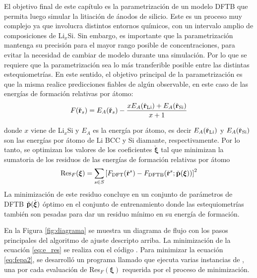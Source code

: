 El objetivo final de este capítulo es la parametrización de un modelo DFTB que 
permita luego simular la litiación de ánodos de silicio. Este es un proceso muy 
complejo ya que involucra distintos entornos químicos, con un intervalo amplio de
composiciones de Li$_x$Si. Sin embargo, es importante que la parametrización
mantenga su precisión para el mayor rango posible de concentraciones, para evitar 
la necesidad de cambiar de modelo  durante una simulación.
Por lo que se requiere que la parametrización sea lo más transferible posible 
entre las distintas estequiometrías. En este sentido, el objetivo principal de la 
parametrización es que la misma realice predicciones fiables de algún observable, 
en este caso de las energías de formación relativas por átomo:
\begin{equation}\label{eq:fepa}
    F(\check{{\bf r}}_s) = E_A(\check{{\bf r}}_s) - \frac{x E_A(\check{{\bf r}}_\text{Li}) + E_A(\check{{\bf r}}_\text{Si})}{x+1}
\end{equation}

donde $x$ viene de Li$_x$Si y $E_A$ es la energía por átomo, es decir 
$E_A(\check{{\bf r}}_\text{Li})$ y $E_A(\check{{\bf r}}_\text{Si})$ son las 
energías por átomo de Li BCC y Si diamante, respectivamente. Por lo tanto, se 
optimizan los valores de los coeficientes $\check{\boldsymbol{\xi}}$ tal que 
minimizan la sumatoria de los residuos de las energías de formación relativas por 
átomo
\begin{equation}\label{eq:fepa2}
    \text{Res}_F(\boldsymbol{\xi}) = \sum_{s\in S} \left[F_\text{DFT}(\check{{\bf r}}^s)-F_\text{DFTB}(\check{{\bf r}}^s;\check{{\bf p}}({\boldsymbol{\xi}}))\right]^2
\end{equation}
La minimización de este residuo concluye en un conjunto de parámetros de DFTB
$\check{{\bf p}}(\check{\boldsymbol{\xi}})$ óptimo en el conjunto de 
entrenamiento donde las estequiometrías también son pesadas para dar un residuo
mínimo en su energía de formación.

En la Figura \ref{fig:diagrama} se muestra un diagrama de flujo con los pasos 
principales del algoritmo de ajuste descripto arriba. La minimización de la 
ecuación \ref{eq:e_res} se realiza con el código  \cite{tango}. Para
minimizar la ecuación \ref{eq:fepa2}, se desarrolló un programa llamado 
 que ejecuta varias instancias de , una por cada
evaluación de Res$_F(\boldsymbol{\xi})$ requerida por el proceso de minimización.

